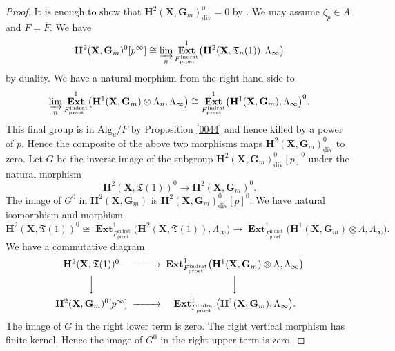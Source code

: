 \documentclass{amsart}
\theoremstyle{remark}
\numberwithin{equation}{section}
\newcommand{\tensor}{\mathbin{\otimes}}
\newcommand{\closure}[1]{\overline{#1}}
\newcommand{\et}{\mathrm{et}}
\newcommand{\Gm}{\mathbf{G}_{m}}
\newcommand{\divis}{\mathrm{div}}
\newcommand{\dirlim}{\varinjlim}
\newcommand{\rat}{\mathrm{rat}}
\newcommand{\ind}{\mathrm{ind}}
\newcommand{\pro}{\mathrm{pro}}
\newcommand{\Alg}{\mathrm{Alg}}
\newcommand{\alg}[1]{\mathbf{#1}}
\DeclareMathOperator{\sheafext}{\alg{Ext}}
\begin{document}
\begin{proof}
	It is enough to show that $\alg{H}^{2}(\alg{X}, \Gm)_{\divis}^{0} = 0$
	by \cite[Proposition 2.2.3]{SuzCurve}.
	We may assume $\zeta_{p} \in A$ and $F = \closure{F}$.
	We have
		\[
				\alg{H}^{2}(\alg{X}, \Gm)^{0}[p^{\infty}]
			\cong
				\dirlim_{n}
				\sheafext^{1}_{F^{\ind\rat}_{\pro\et}} \bigl(
					\alg{H}^{2}(\alg{X}, \mathfrak{T}_{n}(1)),
					\Lambda_{\infty}
				\bigr)
		\]
	by duality.
	We have a natural morphism from the right-hand side to
		\[
				\dirlim_{n}
				\sheafext^{1}_{F^{\ind\rat}_{\pro\et}} \bigl(
					\alg{H}^{1}(\alg{X}, \Gm) \tensor \Lambda_{n},
					\Lambda_{\infty}
				\bigr)
			\cong
				\sheafext^{1}_{F^{\ind\rat}_{\pro\et}} \bigl(
					\alg{H}^{1}(\alg{X}, \Gm),
					\Lambda_{\infty}
				\bigr)^{0}.
		\]
	This final group is in $\Alg_{u} / F$ by Proposition \ref{0044}
	and hence killed by a power of $p$.
	Hence the composite of the above two morphisms maps
	$\alg{H}^{2}(\alg{X}, \Gm)_{\divis}^{0}$ to zero.
	Let $G$ be the inverse image of the subgroup
	$\alg{H}^{2}(\alg{X}, \Gm)_{\divis}^{0}[p]^{0}$
	under the natural morphism
		\[
				\alg{H}^{2}(\alg{X}, \mathfrak{T}(1))^{0}
			\to
				\alg{H}^{2}(\alg{X}, \Gm)^{0}.
		\]
	The image of $G^{0}$ in $\alg{H}^{2}(\alg{X}, \Gm)$ is
	$\alg{H}^{2}(\alg{X}, \Gm)_{\divis}^{0}[p]^{0}$.
	We have natural isomorphism and morphism
		\[
				\alg{H}^{2}(\alg{X}, \mathfrak{T}(1))^{0}
			\cong
				\sheafext^{1}_{F^{\ind\rat}_{\pro\et}} \bigl(
					\alg{H}^{2}(\alg{X}, \mathfrak{T}(1)),
					\Lambda_{\infty}
				\bigr)
			\to
				\sheafext^{1}_{F^{\ind\rat}_{\pro\et}} \bigl(
					\alg{H}^{1}(\alg{X}, \Gm) \tensor \Lambda,
					\Lambda_{\infty}
				\bigr).
		\]
	We have a commutative diagram
		\[
			\begin{CD}
					\alg{H}^{2}(\alg{X}, \mathfrak{T}(1))^{0}
				@>>>
					\sheafext^{1}_{F^{\ind\rat}_{\pro\et}} \bigl(
						\alg{H}^{1}(\alg{X}, \Gm) \tensor \Lambda,
						\Lambda_{\infty}
					\bigr)
				\\ @VVV @VVV \\
					\alg{H}^{2}(\alg{X}, \Gm)^{0}[p^{\infty}]
				@>>>
					\sheafext^{1}_{F^{\ind\rat}_{\pro\et}} \bigl(
						\alg{H}^{1}(\alg{X}, \Gm),
						\Lambda_{\infty}
					\bigr).
			\end{CD}
		\]
	The image of $G$ in the right lower term is zero.
	The right vertical morphism has finite kernel.
	Hence the image of $G^{0}$ in the right upper term is zero.
	

\end{proof}
\end{document}
